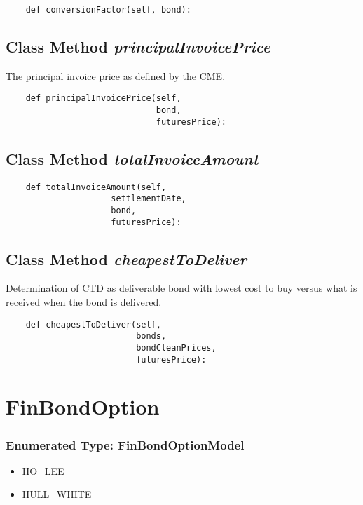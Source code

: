 \documentclass[twoside,11pt]{book}
\begin{document}
\begin{lstlisting}
    def conversionFactor(self, bond):
\end{lstlisting}

\subsection{Class Method {\it principalInvoicePrice}}
The principal invoice price as defined by the CME.

\begin{lstlisting}
    def principalInvoicePrice(self,
                              bond,
                              futuresPrice):
\end{lstlisting}

\subsection{Class Method {\it totalInvoiceAmount}}


\begin{lstlisting}
    def totalInvoiceAmount(self,
                     settlementDate,
                     bond,
                     futuresPrice):
\end{lstlisting}

\subsection{Class Method {\it cheapestToDeliver}}
Determination of CTD as deliverable bond with lowest cost to buy versus what is received when the bond is delivered. 

\begin{lstlisting}
    def cheapestToDeliver(self, 
                          bonds,
                          bondCleanPrices,
                          futuresPrice):
\end{lstlisting}

\newpage
\section{FinBondOption}

\subsubsection{Enumerated Type: FinBondOptionModel}
\begin{itemize}
\item{HO\_LEE}
\item{HULL\_WHITE}
\end{itemize}
\end{document}
